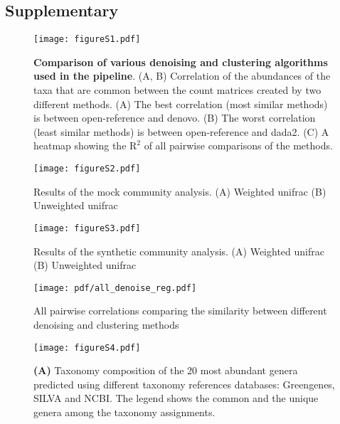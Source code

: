 \FloatBarrier

\subsection*{Supplementary}%

\setcounter{figure}{0}
\renewcommand{\thefigure}{S\arabic{figure}}

\begin{figure}[h]
  \centering
  \texttt{[image: figureS1.pdf]}
  \caption{
    \textbf{Comparison of various denoising and clustering algorithms used in the pipeline}.
    (A, B) Correlation of the abundances of the taxa that are common between the count matrices created by two different methods.
    (A) The best correlation (most similar methods) is between open-reference and denovo.
    (B) The worst correlation (least similar methods) is between open-reference and dada2.
    (C) A heatmap showing the $\mathrm{R}^2$ of all pairwise comparisons of the methods.
  }
  \label{fig:figureS1}
\end{figure}



\begin{figure}[h]
  \centering
  \texttt{[image: figureS2.pdf]}
  \caption{Results of the mock community analysis. (A) Weighted unifrac (B) Unweighted unifrac}
  \label{fig:figureS2}
\end{figure}

\begin{figure}[h]
  \centering
  \texttt{[image: figureS3.pdf]}
  \caption{Results of the synthetic community analysis. (A) Weighted unifrac (B) Unweighted unifrac}
  \label{fig:figureS3}
\end{figure}

\begin{figure}[h]
  \centering
  \texttt{[image: pdf/all\_denoise\_reg.pdf]}
  \caption{All pairwise correlations comparing the similarity between different denoising and clustering methods}
  \label{fig:figureS4}
\end{figure}

\begin{figure}[h]
  \centering
  \texttt{[image: figureS4.pdf]}
  \caption{
    \textbf{(A)} Taxonomy composition of the 20 most abundant genera predicted using different taxonomy references databases: Greengenes, SILVA and NCBI.
    The legend shows the common and the unique genera among the taxonomy assignments.
}
  \label{fig:figureS4}
\end{figure}

